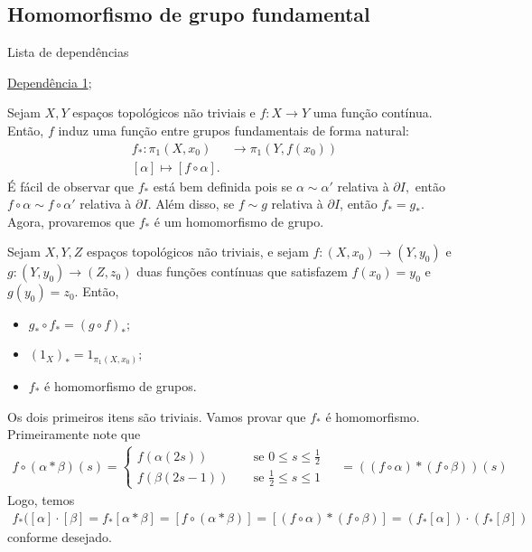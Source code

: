 \subsection{Homomorfismo de grupo fundamental}
\label{hom-grupo-fundamental}
\begin{titlemize}{Lista de dependências}
	\item \hyperref[grupo-fundamental-def]{Dependência 1};\\ %
\end{titlemize}
Sejam $X,Y$ espaços topológicos não triviais e $f:X\rightarrow Y$ uma função contínua. Então, $f$ induz uma função entre grupos fundamentais de forma natural:
\begin{align*}
    f_*:\pi_1(X,x_0)&\longrightarrow\pi_1(Y,f(x_0))\\
    [\alpha]\longmapsto [f\circ \alpha].
\end{align*}
É fácil de observar que $f_*$ está bem definida pois se $\alpha\sim \alpha'$ relativa à $\partial I,$ então $f\circ \alpha\sim f\circ \alpha'$ relativa à $\partial I.$ Além disso, se $f\sim g$ relativa à $\partial I$, então $f_*=g_*.$ Agora, provaremos que $f_*$ é um homomorfismo de grupo.
\begin{prop}
    Sejam $X,Y,Z$ espaços topológicos não triviais, e sejam $f:(X,x_0)\rightarrow (Y,y_0)$ e $g:(Y,y_0)\rightarrow (Z,z_0)$ duas funções contínuas que satisfazem $f(x_0)=y_0$ e $g(y_0)=z_0.$ Então, 
    \begin{itemize}
        \item $g_*\circ f_*=(g\circ f)_*;$
        \item $(1_X)_*=1_{\pi_1(X,x_0)};$
        \item $f_*$ é homomorfismo de grupos.
    \end{itemize}
\end{prop}
    
\begin{dem}
    Os dois primeiros itens são triviais. Vamos provar que $f_*$ é homomorfismo. Primeiramente note que 
    \begin{align*}
        f\circ (\alpha*\beta)(s)=\begin{cases}
            f(\alpha(2s))&\;\;\;\mbox{ se }0\le s\le \frac{1}{2}\\
            f(\beta(2s-1))&\;\;\;\mbox{ se }\frac{1}{2}\le s\le 1
        \end{cases}\;\;\;\;= ((f\circ\alpha)*(f\circ \beta))(s)
    \end{align*}
    Logo, temos
    \begin{align*}
        f_*([\alpha]\cdot [\beta]=f_*[\alpha*\beta]=[f\circ (\alpha*\beta)]=[(f\circ\alpha)*(f\circ\beta)]=(f_*[\alpha])\cdot (f_*[\beta])
    \end{align*}
    conforme desejado.
\end{dem}

